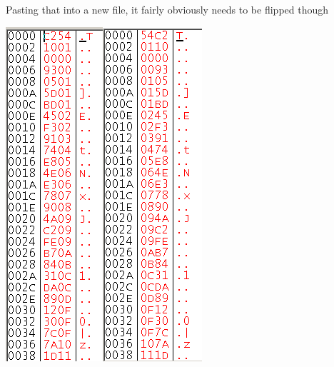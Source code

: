 \documentclass[
]{book}
\begin{document}
Pasting that into a new file, it fairly obviously needs to be flipped though

\includegraphics{images/102_home_fast6191_romhackingguide_unrenamed_fil___borders_romhackingguidepointersexamplehexw2.png}\includegraphics{images/103_home_fast6191_romhackingguide_unrenamed_fil___borders_romhackingguidepointersexamplehexw3.png}
\end{document}
